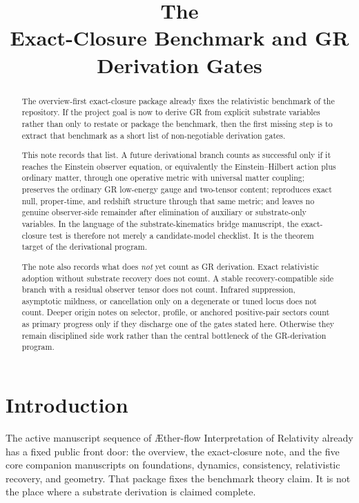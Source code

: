 \documentclass[11pt]{article}
\title{\textbf{The \TheoryName{}}\\[0.4em]
\large Exact-Closure Benchmark and GR Derivation Gates}
\author{}
\date{}
\newcommand{\Aflow}{\AE{}ther-flow}
\newcommand{\TheoryName}{\Aflow{} Interpretation of Relativity}
\begin{document}
\maketitle

\begin{abstract}
The overview-first exact-closure package already fixes the relativistic benchmark of the repository. If the project goal is now to derive GR from explicit substrate variables rather than only to restate or package the benchmark, then the first missing step is to extract that benchmark as a short list of non-negotiable derivation gates.

This note records that list. A future derivational branch counts as successful only if it reaches the Einstein observer equation, or equivalently the Einstein--Hilbert action plus ordinary matter, through one operative metric with universal matter coupling; preserves the ordinary GR low-energy gauge and two-tensor content; reproduces exact null, proper-time, and redshift structure through that same metric; and leaves no genuine observer-side remainder after elimination of auxiliary or substrate-only variables. In the language of the substrate-kinematics bridge manuscript, the exact-closure test is therefore not merely a candidate-model checklist. It is the theorem target of the derivational program.

The note also records what does \emph{not} yet count as GR derivation. Exact relativistic adoption without substrate recovery does not count. A stable recovery-compatible side branch with a residual observer tensor does not count. Infrared suppression, asymptotic mildness, or cancellation only on a degenerate or tuned locus does not count. Deeper origin notes on selector, profile, or anchored positive-pair sectors count as primary progress only if they discharge one of the gates stated here. Otherwise they remain disciplined side work rather than the central bottleneck of the GR-derivation program.
\end{abstract}

\section{Introduction}

The active manuscript sequence of \TheoryName{} already has a fixed public front door: the overview, the exact-closure note, and the five core companion manuscripts on foundations, dynamics, consistency, relativistic recovery, and geometry. That package fixes the benchmark theory claim. It is not the place where a substrate derivation is claimed complete.
\end{document}
